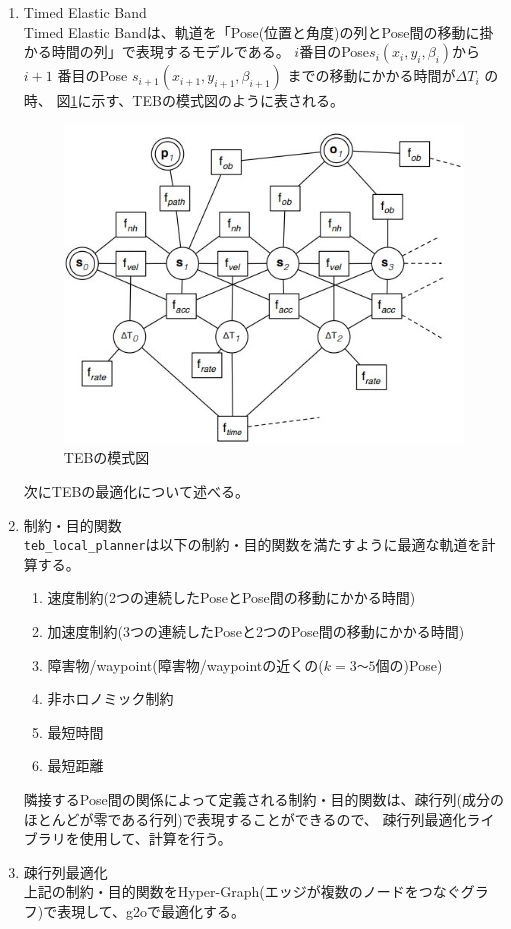 \begin{enumerate}
  \item Timed Elastic Band\\
  Timed Elastic Bandは、軌道を「Pose(位置と角度)の列とPose間の移動に掛かる時間の列」で表現するモデルである。
  $i$番目のPose$s_i(x_i,y_i,\beta_i)$から$i+1$ 番目のPose $s_{i+1}(x_{i+1},y_{i+1},\beta_{i+1})$ までの移動にかかる時間が$\Delta T_i$ の時、
  図\ref{auto:teb:band}に示す、TEBの模式図のように表される。
  \begin{figure}[h]
    \begin{center}
      \includegraphics[width=.6\linewidth]{img/auto_27.jpg}
      \caption{TEBの模式図}
      \label{auto:teb:band}
    \end{center}
  \end{figure}
  次にTEBの最適化について述べる。
  \item 制約・目的関数\\
  \verb|teb_local_planner|は以下の制約・目的関数を満たすように最適な軌道を計算する。
  \begin{enumerate}
    \item 速度制約(2つの連続したPoseとPose間の移動にかかる時間)
    \item 加速度制約(3つの連続したPoseと2つのPose間の移動にかかる時間)
    \item 障害物/waypoint(障害物/waypointの近くの($k=3$\verb|～|$5$個の)Pose)
    \item 非ホロノミック制約
    \item 最短時間
    \item 最短距離
  \end{enumerate}
  隣接するPose間の関係によって定義される制約・目的関数は、疎行列(成分のほとんどが零である行列)で表現することができるので、
  疎行列最適化ライブラリを使用して、計算を行う。
  \item 疎行列最適化\\
  上記の制約・目的関数をHyper-Graph(エッジが複数のノードをつなぐグラフ)で表現して、g2oで最適化する。

\end{enumerate}
